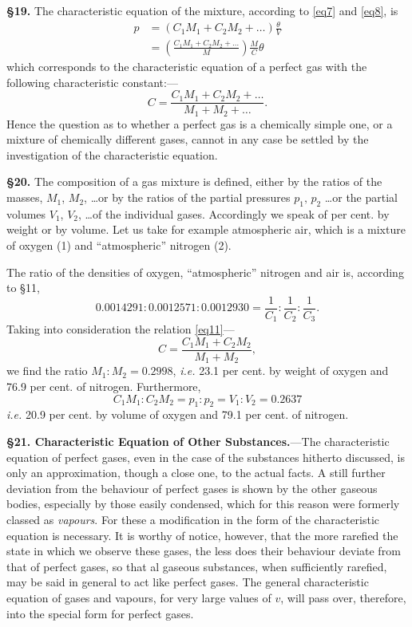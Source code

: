 \documentclass[oneside,12pt]{book}
\begin{document}
\textbf{\S 19.} The characteristic equation of the mixture, according to \eqref{eq7} and \eqref{eq8}, is 
\begin{align*}
    p&=(C_1M_1+C_2M_2+\dots)\frac{\theta}{V} \\
    &=\left(\frac{C_1M_1+C_2M_2+\dots}{M}\right)\frac{M}{C}\theta 
    \tag{10}
    \label{eq10}
\end{align*}
\setcounter{equation}{10}
which corresponds to the characteristic equation of a perfect gas with the following characteristic constant:---
\begin{equation}
    C=\frac{C_1M_1+C_2M_2+\dots}{M_1+M_2+\dots}. 
    \label{eq11}
\end{equation}
Hence the question as to whether a perfect gas is a chemically simple one, or a mixture of chemically different gases, cannot in any case be settled by the investigation of the characteristic equation. \par 

\textbf{\S 20.} The composition of a gas mixture is defined, either by the ratios of the masses, $M_1$, $M_2$, \dots or by the ratios of the partial pressures $p_1,\, p_2$ \dots or the partial volumes $V_1$, $V_2$, \dots of the individual gases. Accordingly we speak of per cent. by weight or by volume. Let us take for example atmospheric air, which is a mixture of oxygen (1) and ``atmospheric'' nitrogen (2). \par 

The ratio of the densities of oxygen, ``atmospheric'' nitrogen and air is, according to \S 11,
$$0.0014291:0.0012571:0.0012930=\frac{1}{C_1}:\frac{1}{C_2}:\frac{1}{C_3}.$$
Taking into consideration the relation \eqref{eq11}---
$$C=\frac{C_1M_1+C_2M_2}{M_1+M_2},$$
we find the ratio $M_1:M_2=0.2998$, \textit{i.e.} 23.1 per cent. by weight of oxygen and 76.9 per cent. of nitrogen. Furthermore, 
$$C_1M_1:C_2M_2=p_1:p_2=V_1:V_2=0.2637$$
\textit{i.e.} 20.9 per cent. by volume of oxygen and 79.1 per cent. of nitrogen. \par 

\textbf{\S 21. Characteristic Equation of Other Substances.}---The characteristic equation of perfect gases, even in the case of the substances hitherto discussed, is only an approximation, though a close one, to the actual facts. A still further deviation from the behaviour of perfect gases is shown by the other gaseous bodies, especially by those easily condensed, which for this reason were formerly classed as \textit{vapours}. For these a modification in the form of the characteristic equation is necessary. It is worthy of notice, however, that the more rarefied the state in which we observe these gases, the less does their behaviour deviate from that of perfect gases, so that al gaseous substances, when sufficiently rarefied, may be said in general to act like perfect gases. The general characteristic equation of gases and vapours, for very large values of $v$, will pass over, therefore, into the special form for perfect gases. \par 
\end{document}
